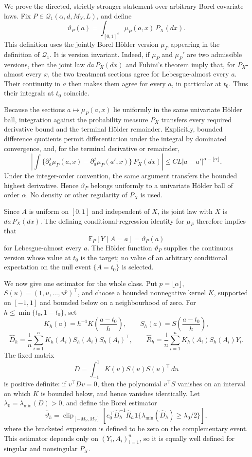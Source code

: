 We prove the directed, strictly stronger statement over arbitrary Borel covariate laws. Fix \(P\in\mathcal Q_1(\alpha,d,M_Y,L)\), and define
\[
\vartheta_P(a)=\int_{[0,1]^d}\mu_P(a,x)\,P_X(dx).
\]
This definition uses the jointly Borel H\"older version \(\mu_P\) appearing in the definition of \(\mathcal Q_1\). It is version invariant. Indeed, if \(\mu_P\) and \(\mu_P'\) are two admissible versions, then the joint law \(da\,P_X(dx)\) and Fubini's theorem imply that, for \(P_X\)-almost every \(x\), the two treatment sections agree for Lebesgue-almost every \(a\). Their continuity in \(a\) then makes them agree for every \(a\), in particular at \(t_0\). Thus their integrals at \(t_0\) coincide.

Because the sections \(a\mapsto\mu_P(a,x)\) lie uniformly in the same univariate H\"older ball, integration against the probability measure \(P_X\) transfers every required derivative bound and the terminal H\"older remainder. Explicitly, bounded difference quotients permit differentiation under the integral by dominated convergence, and, for the terminal derivative or remainder,
\[
\left\lvert\int\{\partial_a^j\mu_P(a,x)-\partial_a^j\mu_P(a',x)\}\,P_X(dx)\right\rvert
\le C L\lvert a-a'\rvert^{\alpha-\lfloor\alpha\rfloor}.
\]
Under the integer-order convention, the same argument transfers the bounded highest derivative. Hence \(\vartheta_P\) belongs uniformly to a univariate H\"older ball of order \(\alpha\). No density or other regularity of \(P_X\) is used.

Since \(A\) is uniform on \([0,1]\) and independent of \(X\), its joint law with \(X\) is \(da\,P_X(dx)\). The defining conditional-regression identity for \(\mu_P\) therefore implies that
\[
\mathbb E_P[Y\mid A=a]=\vartheta_P(a)
\]
for Lebesgue-almost every \(a\). The H\"older function \(\vartheta_P\) supplies the continuous version whose value at \(t_0\) is the target; no value of an arbitrary conditional expectation on the null event \(\{A=t_0\}\) is selected.

We now give one estimator for the whole class. Put \(p=\lfloor\alpha\rfloor\), \(S(u)=(1,u,\ldots,u^p)^\top\), and choose a bounded nonnegative kernel \(K\), supported on \([-1,1]\) and bounded below on a neighbourhood of zero. For \(h\le\min\{t_0,1-t_0\}\), set
\[
K_h(a)=h^{-1}K\!\left(\frac{a-t_0}{h}\right),
\qquad
S_h(a)=S\!\left(\frac{a-t_0}{h}\right),
\]
\[
\widehat D_h=\frac1n\sum_{i=1}^nK_h(A_i)S_h(A_i)S_h(A_i)^\top,
\qquad
\widehat R_h=\frac1n\sum_{i=1}^nK_h(A_i)S_h(A_i)Y_i.
\]
The fixed matrix
\[
D=\int_{-1}^1K(u)S(u)S(u)^\top\,du
\]
is positive definite: if \(v^\top Dv=0\), then the polynomial \(v^\top S\) vanishes on an interval on which \(K\) is bounded below, and hence vanishes identically. Let \(\lambda_0=\lambda_{\min}(D)>0\), and define the Borel estimator
\[
\widehat\vartheta_h=
\operatorname{clip}_{[-M_Y,M_Y]}
\left[
 e_0^\top\widehat D_h^{-1}\widehat R_h
 \mathbf 1\{\lambda_{\min}(\widehat D_h)\ge\lambda_0/2\}
\right],
\]
where the bracketed expression is defined to be zero on the complementary event. This estimator depends only on \((Y_i,A_i)_{i=1}^n\), so it is equally well defined for singular and nonsingular \(P_X\).

